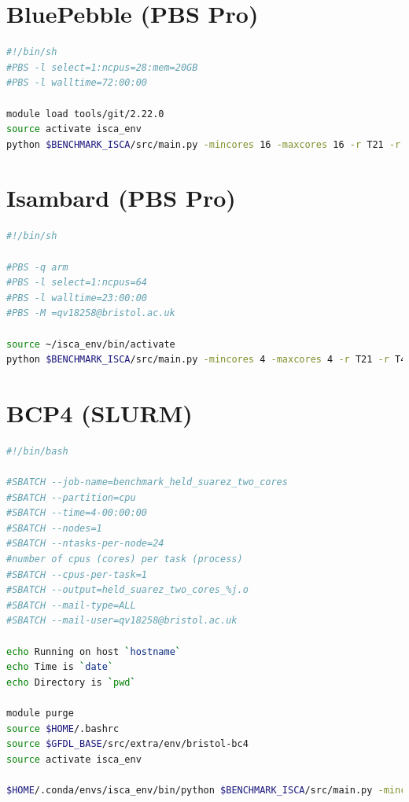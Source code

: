 \documentclass[a4paper,11pt]{report}
\newcommand{\toclesssection}[1]{\section{#1}\addtocounter{section}{1}}
\begin{document}
\toclesssection{BluePebble (PBS Pro)}
\begin{lstlisting}[language=bash]
#!/bin/sh
#PBS -l select=1:ncpus=28:mem=20GB
#PBS -l walltime=72:00:00

module load tools/git/2.22.0
source activate isca_env
python $BENCHMARK_ISCA/src/main.py -mincores 16 -maxcores 16 -r T21 -r T42 -codebase grey_mars -fc kind_4
\end{lstlisting}



\toclesssection{Isambard (PBS Pro)}
\begin{lstlisting}[language=bash]
#!/bin/sh

#PBS -q arm
#PBS -l select=1:ncpus=64
#PBS -l walltime=23:00:00
#PBS -M =qv18258@bristol.ac.uk

source ~/isca_env/bin/activate
python $BENCHMARK_ISCA/src/main.py -mincores 4 -maxcores 4 -r T21 -r T42 -r T85 -codebase held_suarez -fc cray_temp
\end{lstlisting}

\toclesssection{BCP4 (SLURM)}

\begin{lstlisting}[language=bash]
#!/bin/bash

#SBATCH --job-name=benchmark_held_suarez_two_cores
#SBATCH --partition=cpu
#SBATCH --time=4-00:00:00
#SBATCH --nodes=1
#SBATCH --ntasks-per-node=24
#number of cpus (cores) per task (process)
#SBATCH --cpus-per-task=1
#SBATCH --output=held_suarez_two_cores_%j.o
#SBATCH --mail-type=ALL
#SBATCH --mail-user=qv18258@bristol.ac.uk

echo Running on host `hostname`
echo Time is `date`
echo Directory is `pwd`

module purge
source $HOME/.bashrc
source $GFDL_BASE/src/extra/env/bristol-bc4
source activate isca_env

$HOME/.conda/envs/isca_env/bin/python $BENCHMARK_ISCA/src/main.py -mincores 2 -maxcores 2 -r T21 -r T42 -codebase held_suarez -fc gcc
\end{lstlisting}
\end{document}
